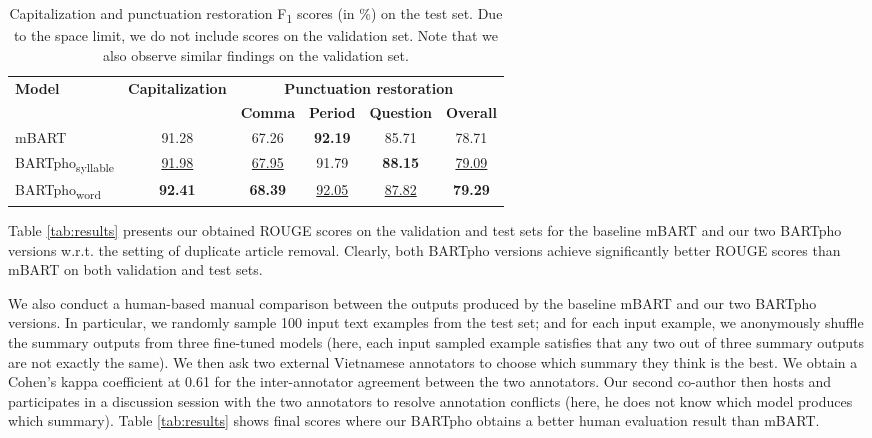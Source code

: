 \documentclass[a4paper]{article}
\begin{document}
\begin{table*}[!t]
\centering
\caption{Capitalization and punctuation restoration  F\textsubscript{1} scores (in \%) on the test set. Due to the space limit, we do not include scores on the validation set. Note that we also observe similar findings on the validation set. }

\def\arraystretch{1.1}
\begin{tabular}{l|c|c|c|c|c}
\hline
\multirow{2}{*}{\textbf{Model}} & \multirow{2}{*}{\textbf{Capitalization}} & \multicolumn{4}{c}{\textbf{Punctuation restoration}} \\
\cline{3-6}
& & \textbf{Comma} & \textbf{Period}  
& \textbf{Question} & \textbf{Overall}
\\
\hline
mBART & 91.28 &  67.26 & \textbf{92.19} & 85.71  & 78.71  \\
BARTpho\textsubscript{syllable} & \underline{91.98} & \underline{67.95} & 91.79 & \textbf{88.15} & \underline{79.09}  \\
BARTpho\textsubscript{word} & \textbf{92.41} &  \textbf{68.39} & \underline{92.05} & \underline{87.82}  & \textbf{79.29}   \\
\hline
\end{tabular}


\label{tab:punct_results}
\end{table*}

Table \ref{tab:results} presents our obtained ROUGE scores on the validation and test sets for the baseline mBART and our two BARTpho versions w.r.t. the setting of duplicate article removal. Clearly, both BARTpho versions achieve  significantly better  ROUGE scores than mBART on both validation and test sets.



We also conduct a human-based manual comparison between the outputs produced by the baseline mBART and our two BARTpho versions. In particular, we randomly sample 100
input text examples from the test set; and for each input example, we anonymously shuffle the summary outputs from three fine-tuned models (here, each input sampled example satisfies that any two out of three summary outputs are not exactly the same).  We then ask two external Vietnamese annotators to choose which summary they think is the best. We obtain a Cohen's kappa coefficient at 0.61 for the inter-annotator agreement between the two annotators. Our second co-author then hosts and participates in a discussion session with the two annotators to resolve annotation conflicts (here, he does not know which model produces which summary). Table \ref{tab:results} shows final scores where our BARTpho obtains a better human evaluation result than mBART.
\end{document}
